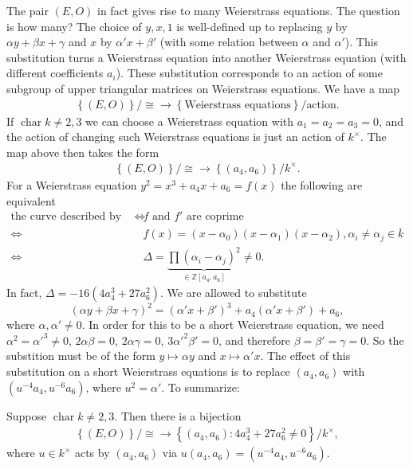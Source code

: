 The pair \( (E,O) \) in fact gives rise to many Weierstrass equations. The question is how many?
The choice of \( y,x,1 \) is well-defined up to replacing \( y \) by \( \alpha y + \beta x + \gamma \) and \( x \) by \( \alpha' x + \beta' \) (with some relation between \( \alpha \) and \( \alpha' \)).
This substitution turns a Weierstrass equation into another Weierstrass equation (with different coefficients \( a_i \)).
These substitution corresponds to an action of some subgroup of upper triangular matrices on Weierstrass equations.
We have a map
\begin{align*}
  \left\lbrace (E,O) \right\rbrace/\cong \to \left\lbrace \text{Weierstrass equations} \right\rbrace/\text{action} .
\end{align*}
If \( \operatorname{char} k \neq 2,3 \) we can choose a Weierstrass equation with \( a_1 = a_2 = a_3 = 0 \), and the action of changing such Weierstrass equations is just an action of \( k^\times \).
The map above then takes the form
\begin{align*}
  \left\lbrace (E,O) \right\rbrace/\cong \to \left\lbrace (a_4,a_6) \right\rbrace/ k^\times .
\end{align*}
For a Weierstrass equation \( y^2 = x^3 + a_4 x + a_6 = f(x) \) the following are equivalent
\begin{align*}
  \text{the curve described by the Weierstrass equation is smooth}
  \iff &  f \text{ and } f' \text{ are coprime}\\
  \iff & f(x) = (x-\alpha_0)(x-\alpha_1)(x-\alpha_2), \alpha_i \neq \alpha_j \in \overline{k} \\
  \iff & \Delta = \underbrace{\prod (\alpha_i - \alpha_j)^2}_{\in \mathbb{Z}[a_4,a_6]} \neq 0 .
\end{align*}
In fact, \( \Delta = - 16 (4 a_4^3 + 27 a_6^2 ) \).
We are allowed to substitute
\[ \left( \alpha y + \beta x + \gamma \right)^2 = \left( \alpha' x + \beta' \right)^3 + a_4 \left( \alpha' x + \beta' \right) + a_6 , \]
where \( \alpha, \alpha' \neq 0 \).
In order for this to be a short Weierstrass equation, we need \( \alpha^2 = \alpha'^3 \neq 0 \), \( 2 \alpha \beta = 0 \), \( 2 \alpha \gamma = 0 \), \( 3 \alpha'^2 \beta' = 0 \), and therefore \( \beta = \beta' = \gamma = 0 \).
So the substition must be of the form \( y \mapsto \alpha y \) and \( x \mapsto \alpha' x \).
The effect of this substitution on a short Weierstrass equations is to replace \( (a_4,a_6) \) with \( \left( u^{-4} a_4, u^{-6} a_6 \right) \), where \( u^2 = \alpha' \).
To summarize:
\begin{proposition}
  Suppose \( \operatorname{char} k \neq 2,3 \).
  Then there is a bijection
  \begin{align*}
    \left\lbrace (E,O) \right\rbrace/ \cong \to \left\lbrace (a_4,a_6) : 4 a_4^3 + 27a_6^2 \neq 0 \right\rbrace/ k^\times ,
  \end{align*}
  where \( u \in k^\times \) acts by \( (a_4,a_6) \) via \( u (a_4,a_6) = \left( u^{-4} a_4, u^{-6} a_6 \right) \).
\end{proposition}
